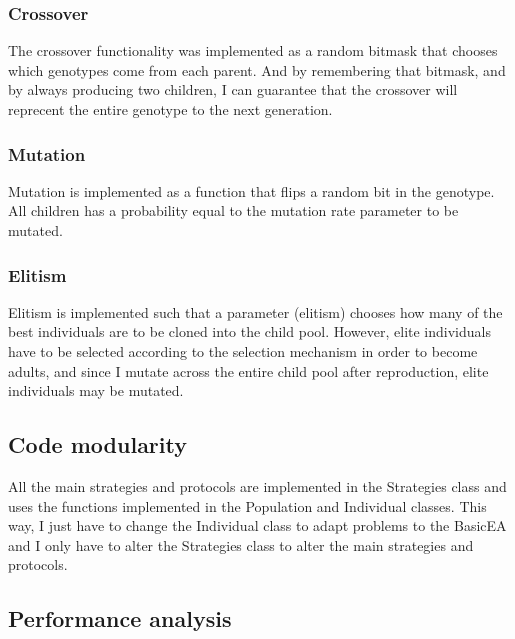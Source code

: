 \documentclass[11pt]{article}
\begin{document}
\subsubsection*{Crossover}

The crossover functionality was implemented as a random bitmask that 
chooses which genotypes come from each parent. And by remembering that
bitmask, and by always producing two children, I can guarantee that the 
crossover will reprecent the entire genotype to the next generation.

\subsubsection*{Mutation}

Mutation is implemented as a function that flips a random bit in the genotype.
All children has a probability equal to the mutation rate parameter to be
mutated. 

\subsubsection*{Elitism}

Elitism is implemented such that a parameter (elitism) chooses how many
of the best individuals are to be cloned into the child pool. However, elite 
individuals have to be selected according to the selection mechanism in order
to become adults, and since I mutate across the entire child pool after reproduction, 
elite individuals may be mutated.

\subsection*{Code modularity} %

All the main strategies and protocols are implemented in the Strategies class and
uses the functions implemented in the Population and Individual classes.
This way, I just have to change the Individual class to adapt problems to the
BasicEA and I only have to alter the Strategies class to alter the 
main strategies and protocols.

\subsection*{Performance analysis} %
\end{document}
